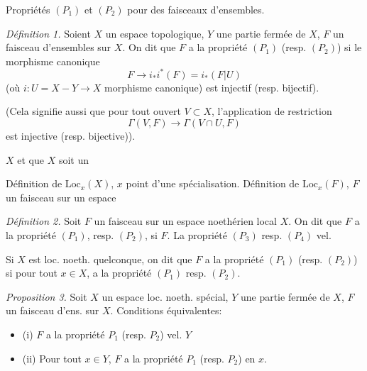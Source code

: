 \documentclass[11pt,a4paper]{article}
\begin{document}
Propriétés $(P_1)$ et $(P_2)$ pour des faisceaux d'ensembles.


\emph{Définition 1.} Soient $X$ un espace topologique, $Y$ une partie fermée de $X$, $F$ un faisceau d'ensembles sur $X$. On dit que $F$ a la propriété $(P_1)$ (resp. $(P_2)$) si le morphisme canonique
\[
  F \longrightarrow i_{*} i^{*}(F) = i_{*}(F|U)
\]
(où $i : U = X - Y \longrightarrow X$ morphisme canonique) est injectif (resp. bijectif).

(Cela signifie aussi que pour tout ouvert $V \subset X$, l'application de restriction
\[
  \Gamma(V,F) \longrightarrow \Gamma(V \cap U, F)
\]
est injective (resp. bijective)).



\ill{}   \ill{} $X$ \ill{}  \ill{} et \ill{} que $X$ soit un \ill{}

Définition de \struck{\ill{}} $\mathrm{Loc}_x(X)$, $x$ point d'une spécialisation. Définition de \struck{\ill{}} $\mathrm{Loc}_x(F)$, $F$ un faisceau sur un espace \ill{}

\emph{Définition 2.} Soit $F$ un faisceau \ill{} sur un espace noethérien local $X$. \ill{} On dit que $F$ a la propriété $(P_1)$, resp. $(P_2)$, si \ill{} $F$. La propriété $(P_3)$ resp. $(P_4)$ vel. 

Si $X$ est loc. noeth. quelconque, on dit que $F$ a la propriété $(P_1)$ (resp. $(P_2)$) \ill{} si pour tout $x \in X$,  a la propriété $(P_1)$ resp. $(P_2)$.

\emph{Proposition 3.} Soit $X$ un espace loc. noeth. spécial, $Y$ une partie fermée de $X$, $F$ un faisceau d'ens. sur $X$. Conditions équivalentes:
\begin{itemize}
  \item (i) $F$ a la propriété $P_1$ (resp. $P_2$) vel. \ill{} $Y$
  \item (ii) \struck{\ill{}} Pour tout $x \in Y$, $F$ a la propriété $P_1$ (resp. $P_2$) en $x$.
\end{itemize}
\end{document}
